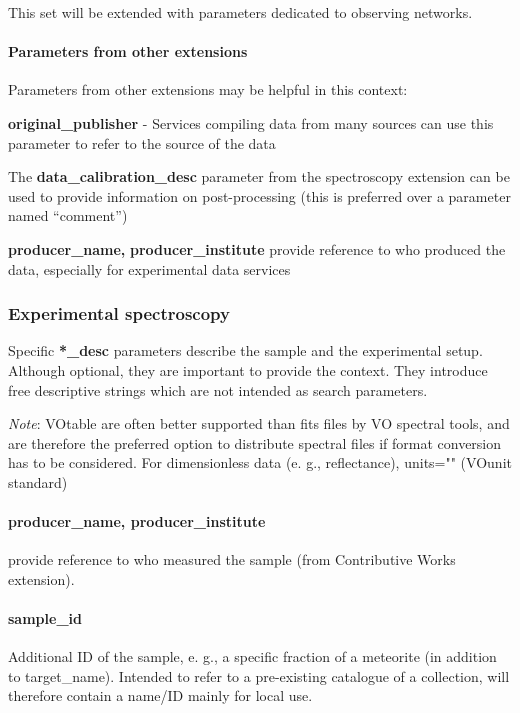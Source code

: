 \documentclass[11pt,a4paper]{ivoa}
\begin{document}
This set will be extended with parameters dedicated to observing networks.

\paragraph{Parameters from other extensions}

Parameters from other extensions may be helpful in this context:

\textbf{original\_publisher} - Services compiling data from many sources can use this\textbf{ }parameter to refer to the source of the data

The\textbf{ \textbf{data\_calibration\_desc}} parameter from the spectroscopy extension can be used to provide information on post-processing (this is preferred over a parameter named ``comment'')

\textbf{producer\_name, }\textbf{producer\_institute }provide reference to who produced the data, especially for experimental data services

\subsubsection{Experimental spectroscopy}

Specific \textbf{*\_desc} parameters describe the sample and the experimental setup. Although optional, they are important to provide the context. They introduce free descriptive strings which are not intended as search parameters.

\emph{Note}: VOtable are often better supported than fits files by VO spectral tools, and are therefore the preferred option to distribute spectral files if format conversion has to be considered. For dimensionless data (e. g., reflectance), units="" (VOunit standard)

\paragraph{producer\_name, producer\_institute}

provide reference to who measured the sample (from Contributive Works extension).

\paragraph{sample\_id}

Additional ID of the sample, e. g., a specific fraction of a meteorite (in addition to target\_name). Intended to refer to a pre-existing catalogue of a collection, will therefore contain a name/ID mainly for local use. 
\end{document}
